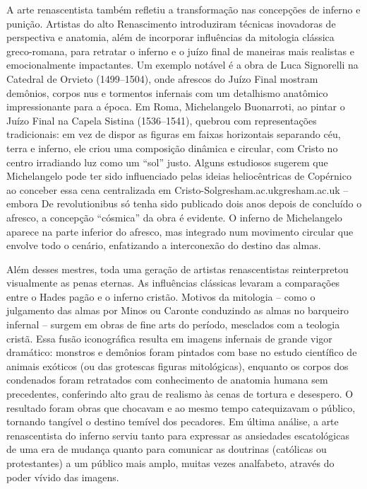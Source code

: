A arte renascentista também refletiu a transformação nas concepções de inferno e punição. Artistas do alto Renascimento introduziram técnicas inovadoras de perspectiva e anatomia, além de incorporar influências da mitologia clássica greco-romana, para retratar o inferno e o juízo final de maneiras mais realistas e emocionalmente impactantes. Um exemplo notável é a obra de Luca Signorelli na Catedral de Orvieto (1499--1504), onde afrescos do Juízo Final mostram demônios, corpos nus e tormentos infernais com um detalhismo anatômico impressionante para a época. Em Roma, Michelangelo Buonarroti, ao pintar o Juízo Final na Capela Sistina (1536--1541), quebrou com representações tradicionais: em vez de dispor as figuras em faixas horizontais separando céu, terra e inferno, ele criou uma composição dinâmica e circular, com Cristo no centro irradiando luz como um “sol” justo. Alguns estudiosos sugerem que Michelangelo pode ter sido influenciado pelas ideias heliocêntricas de Copérnico ao conceber essa cena centralizada em Cristo-Solgresham.ac.ukgresham.ac.uk -- embora De revolutionibus só tenha sido publicado dois anos depois de concluído o afresco, a concepção “cósmica” da obra é evidente. O inferno de Michelangelo aparece na parte inferior do afresco, mas integrado num movimento circular que envolve todo o cenário, enfatizando a interconexão do destino das almas.

Além desses mestres, toda uma geração de artistas renascentistas reinterpretou visualmente as penas eternas. As influências clássicas levaram a comparações entre o Hades pagão e o inferno cristão. Motivos da mitologia -- como o julgamento das almas por Minos ou Caronte conduzindo as almas no barqueiro infernal -- surgem em obras de fine arts do período, mesclados com a teologia cristã. Essa fusão iconográfica resulta em imagens infernais de grande vigor dramático: monstros e demônios foram pintados com base no estudo científico de animais exóticos (ou das grotescas figuras mitológicas), enquanto os corpos dos condenados foram retratados com conhecimento de anatomia humana sem precedentes, conferindo alto grau de realismo às cenas de tortura e desespero. O resultado foram obras que chocavam e ao mesmo tempo catequizavam o público, tornando tangível o destino temível dos pecadores. Em última análise, a arte renascentista do inferno serviu tanto para expressar as ansiedades escatológicas de uma era de mudança quanto para comunicar as doutrinas (católicas ou protestantes) a um público mais amplo, muitas vezes analfabeto, através do poder vívido das imagens.

